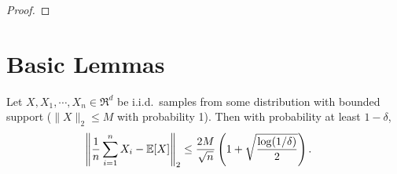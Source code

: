 \documentclass[tablecaption=bottom]{jmlr}
\begin{document}
\begin{proof}
\end{proof}

\section{Basic Lemmas}

\begin{lemma}
  \label{lem:conc-norms}
  Let $X, X_1, \cdots, X_n \in \Re^d$ be i.i.d.\ samples
  from some distribution with bounded support
  ($\|X\|_2 \le M$ with probability 1).
  Then with probability at least $1 - \delta$,
  \begin{align}
    \left\| \frac{1}{n} \sum_{i=1}^{n} X_i - \operatorname{\mathbb{E}}[X] \right\|_2 &
    \le \frac{2M}{\sqrt{n}} \left(1 + \sqrt{\frac{\log(1/\delta)}{2}}\right).
  \end{align}
\end{lemma}
\end{document}

